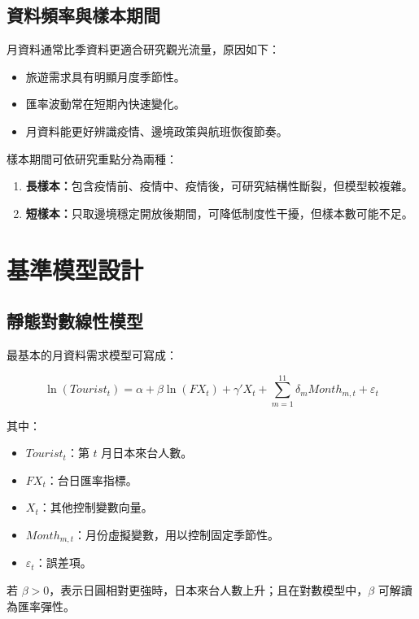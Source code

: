 \documentclass[12pt,a4paper,fontset=none]{ctexart}
\begin{document}
\subsection{資料頻率與樣本期間}

月資料通常比季資料更適合研究觀光流量，原因如下：

\begin{itemize}
  \item 旅遊需求具有明顯月度季節性。
  \item 匯率波動常在短期內快速變化。
  \item 月資料能更好辨識疫情、邊境政策與航班恢復節奏。
\end{itemize}

樣本期間可依研究重點分為兩種：

\begin{enumerate}
  \item \textbf{長樣本：}包含疫情前、疫情中、疫情後，可研究結構性斷裂，但模型較複雜。
  \item \textbf{短樣本：}只取邊境穩定開放後期間，可降低制度性干擾，但樣本數可能不足。
\end{enumerate}

\section{基準模型設計}

\subsection{靜態對數線性模型}

最基本的月資料需求模型可寫成：

\begin{equation}
\ln(Tourist_t)
= \alpha
+ \beta \ln(FX_t)
+ \gamma' X_t
+ \sum_{m=1}^{11} \delta_m Month_{m,t}
+ \varepsilon_t
\end{equation}

其中：

\begin{itemize}
  \item $Tourist_t$：第 $t$ 月日本來台人數。
  \item $FX_t$：台日匯率指標。
  \item $X_t$：其他控制變數向量。
  \item $Month_{m,t}$：月份虛擬變數，用以控制固定季節性。
  \item $\varepsilon_t$：誤差項。
\end{itemize}

若 $\beta > 0$，表示日圓相對更強時，日本來台人數上升；且在對數模型中，$\beta$ 可解讀為匯率彈性。
\end{document}
